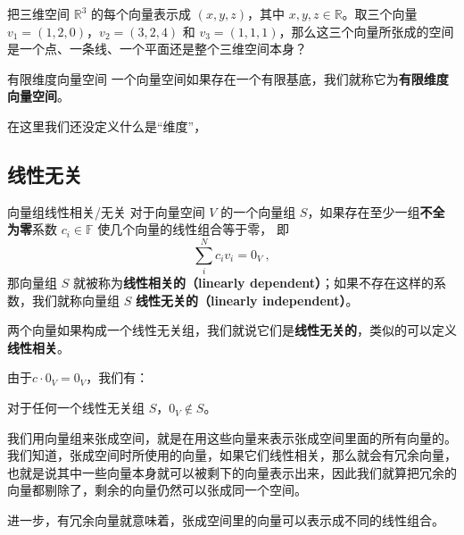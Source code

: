 \begin{exercise}{}\label{exe_VecSpn_1}
把三维空间 $\mathbb{R}^3$ 的每个向量表示成 $(x,y,z)$，其中 $x,y,z\in\mathbb{R}$。取三个向量 $v_1 = (1,2,0)$，$v_2 = (3,2,4)$ 和 $v_3 = (1,1,1)$，那么这三个向量所张成的空间是一个点、一条线、一个平面还是整个三维空间本身？

\end{exercise}


\begin{definition}{有限维度向量空间}
一个向量空间如果存在一个有限基底，我们就称它为\textbf{有限维度向量空间}。
\end{definition}

在这里我们还没定义什么是“维度”，

\subsection{线性无关}


\begin{definition}{向量组线性相关/无关}
对于向量空间 $V$ 的一个向量组 $S$，如果存在至少一组\textbf{不全为零}系数 $c_i \in \mathbb{F}$ 使几个向量的线性组合等于零， 即
\begin{equation}\label{eq_VecSpn_2}
\sum_i^N c_i v_i = 0_V~,
\end{equation}
那向量组 $S$ 就被称为\textbf{线性相关的（linearly dependent）}；如果不存在这样的系数，我们就称向量组 $S$ \textbf{线性无关的（linearly independent）}。

两个向量如果构成一个线性无关组，我们就说它们是\textbf{线性无关的}，类似的可以定义\textbf{线性相关}。
\end{definition}

由于$c \cdot 0_V = 0_V$，我们有：
\begin{theorem}{}
对于任何一个线性无关组 $S$，$0_V \not\in S$。
\end{theorem}

我们用向量组来张成空间，就是在用这些向量来表示张成空间里面的所有向量的。我们知道，张成空间时所使用的向量，如果它们线性相关，那么就会有冗余向量，也就是说其中一些向量本身就可以被剩下的向量表示出来，因此我们就算把冗余的向量都剔除了，剩余的向量仍然可以张成同一个空间。

进一步，有冗余向量就意味着，张成空间里的向量可以表示成不同的线性组合。

